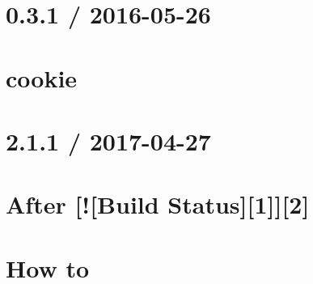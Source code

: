 \documentclass[twoside]{book}
\newcommand{\+}{\discretionary{\mbox{\scriptsize$\hookleftarrow$}}{}{}}
\begin{document}
\chapter{0.3.1 / 2016-\/05-\/26}
\label{md_bin_node_modules_socket_8io_node_modules_engine_8io_node_modules_cookie__h_i_s_t_o_r_y}

\chapter{cookie}
\label{md_bin_node_modules_socket_8io_node_modules_engine_8io_node_modules_cookie__r_e_a_d_m_e}

\chapter{2.1.1 / 2017-\/04-\/27}
\label{md_bin_node_modules_socket_8io_node_modules_engine_8io_node_modules_engine_8io-parser__history}

\chapter{After \mbox{[}!\mbox{[}Build Status\mbox{]}\mbox{[}1\mbox{]}\mbox{]}\mbox{[}2\mbox{]}}
\label{md_bin_node_modules_socket_8io_node_modules_engine_8io_node_modules_engine_8io-parser_node_modules_after__r_e_a_d_m_e}

\chapter{How to}
\label{md_bin_node_modules_socket_8io_node_modules_engine_8io_node_modules_engine_8io-parser_node_modulcd99599169982db92706e2f667c5a36a}

\end{document}
